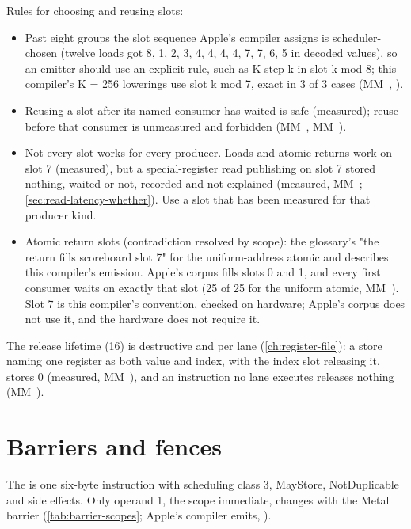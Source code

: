 Rules for choosing and reusing slots:

\begin{itemize}
\item Past eight groups the slot sequence Apple's compiler assigns is scheduler-chosen (twelve loads got 8, 1, 2, 3, 4, 4, 4,
  4, 7, 7, 6, 5 in decoded values), so an emitter should use an explicit rule, such as K-step k in slot k mod 8; this
  compiler's K = 256 lowerings use slot k mod 7, exact in 3 of 3 cases (MM~, ).
\item Reusing a slot after its named consumer has waited is safe (measured); reuse before that consumer is unmeasured and
  forbidden (MM~, MM~).
\item Not every slot works for every producer. Loads and atomic returns work on slot 7 (measured), but a special-register read
  publishing on slot 7 stored nothing, waited or not, recorded and not explained (measured, MM~; \cref{sec:read-latency-whether}). Use a
  slot that has been measured for that producer kind.
\item Atomic return slots (contradiction resolved by scope): the glossary's "the return fills scoreboard slot 7" for the
  uniform-address atomic and  describes this compiler's emission. Apple's corpus fills slots 0
  and 1, and every first consumer waits on exactly that slot (25 of 25 for the uniform atomic, MM~). Slot 7 is this compiler's convention,
  checked on hardware; Apple's corpus does not use it, and the hardware does not require it.
\end{itemize}

The release lifetime (16) is destructive and per lane (\cref{ch:register-file}): a store naming one
register as both value and index, with the index slot releasing it, stores 0 (measured, MM~), and an instruction no
lane executes releases nothing (MM~).

\section{Barriers and fences}\label{sec:barriers-fences}

The  is one six-byte instruction with scheduling class 3, MayStore, NotDuplicable and side effects.
Only operand 1, the scope immediate, changes with the Metal barrier (\cref{tab:barrier-scopes}; Apple's compiler emits,
).

